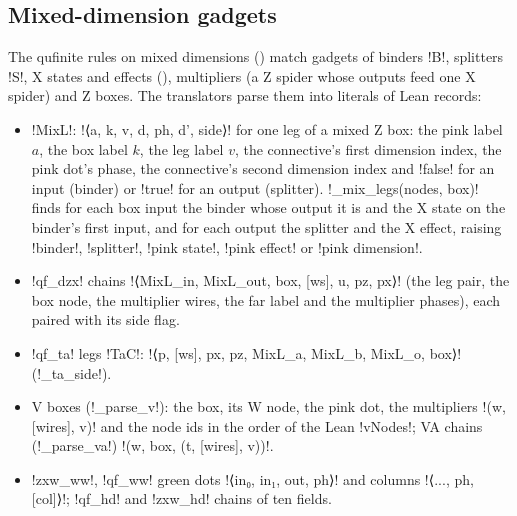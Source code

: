 {\subsection{Mixed-dimension gadgets}\label{sec:lean-export-net-mixed}

The qufinite rules on mixed dimensions (\cite{wang2023qufinitezxw}) match gadgets of binders
\code!B!, splitters \code!S!, X states and effects (), multipliers (a Z spider
whose outputs feed one X spider) and Z boxes. The translators parse them into literals of Lean
records:

\begin{itemize}
\item \code!MixL!: \code!⟨a, k, v, d, ph, d', side⟩! for one leg of a mixed Z box: the pink
  label $a$, the box label $k$, the leg label $v$, the connective's first dimension index, the
  pink dot's phase, the connective's second dimension index and \code!false! for an input
  (binder) or \code!true! for an output (splitter). \py!_mix_legs(nodes, box)! finds for each box
  input the binder whose output it is and the X state on the binder's first input, and for each
  output the splitter and the X effect, raising \code!binder!, \code!splitter!,
  \code!pink state!, \code!pink effect! or \code!pink dimension!.
\item \code!qf_dzx! chains \code!⟨MixL_in, MixL_out, box, [ws], u, pz, px⟩! (the leg pair, the
  box node, the multiplier wires, the far label and the multiplier phases), each paired with its
  side flag.
\item \code!qf_ta! legs \code!TaC!: \code!⟨p, [ws], px, pz, MixL_a, MixL_b, MixL_o, box⟩!
  (\py!_ta_side!).
\item V boxes (\py!_parse_v!): the box, its W node, the pink dot, the multipliers
  \code!(w, [wires], v)! and the node ids in the order of the Lean \code!vNodes!; VA chains
  (\py!_parse_va!) \code!(w, box, (t, [wires], v))!.
\item \code!zxw_ww!, \code!qf_ww! green dots \code!⟨in₀, in₁, out, ph⟩! and columns
  \code!⟨..., ph, [col]⟩!; \code!qf_hd! and \code!zxw_hd! chains of ten fields.
\end{itemize}

}
